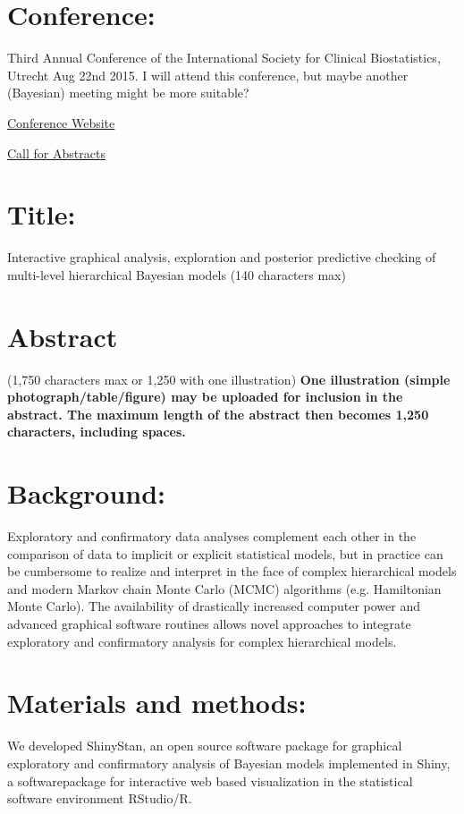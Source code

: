 \documentclass[11pt,notitlepage]{article}
\begin{document}
\section*{Conference:}

Third Annual Conference of the International Society for Clinical Biostatistics, Utrecht Aug 22nd 2015. I will attend this conference, but maybe another (Bayesian) meeting might be more suitable?

\href{http://www.iscb.info/ISCB2015.html}{Conference Website}

\href{http://www.iscb2015.info/abstract-submission}{Call for Abstracts}



\section*{Title:}

Interactive graphical analysis, exploration and posterior predictive checking of multi-level hierarchical Bayesian models (140 characters max)
\section*{Abstract}
(1,750 characters max or 1,250 with one illustration) \textbf{One illustration (simple photograph/table/figure) may be uploaded for inclusion in the abstract. The maximum length of the abstract then becomes 1,250 characters, including spaces.}

\section*{Background:}
Exploratory and confirmatory data analyses complement each other in the comparison of data to implicit or explicit statistical models, but in practice can be cumbersome to realize and interpret in the face of complex hierarchical models and modern Markov chain Monte Carlo (MCMC) algorithms (e.g. Hamiltonian Monte Carlo). The availability of drastically increased computer power and advanced graphical software routines allows novel approaches to integrate exploratory and confirmatory analysis for complex hierarchical models.

\section*{Materials and methods:}
We developed ShinyStan, an open source software package for graphical exploratory and confirmatory analysis of Bayesian models implemented in Shiny, a softwarepackage for interactive web based visualization in the statistical software environment RStudio/R.  
\end{document}
